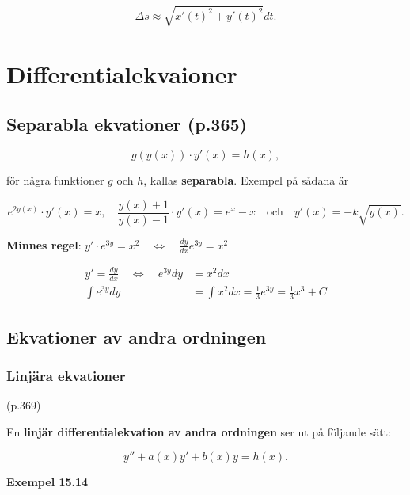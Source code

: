 \documentclass[11pt]{article}
\begin{document}
\begin{equation}
    \Delta s \approx \sqrt{x'(t)^2 + y'(t)^2}dt.
    \label{eq:kurvlangd}
\end{equation}

\newpage
\section{Differentialekvaioner}

\subsection{Separabla ekvationer (p.365)}

\begin{equation}
    g(y(x)) \cdot y'(x) = h(x),
\end{equation}

för några funktioner $g$ och $h$, kallas \textbf{separabla}. Exempel på sådana är

\begin{equation}
    e^{2y(x)} \cdot y'(x) = x, \quad \frac{y(x) + 1}{y(x) - 1} \cdot y'(x) = e^x - x \quad \text{och} \quad y'(x) = -k\sqrt{y(x)}.
\end{equation}

\textbf{Minnes regel}: $y' \cdot e^{3y} = x^2 \quad \Leftrightarrow \quad \frac{dy}{dx}e^{3y} = x^2$

\begin{align}
    y' = \frac{dy}{dx} \quad \Leftrightarrow \quad e^{3y}dy &= x^2 dx\\
    \int e^{3y}dy &= \int x^2 dx = \frac{1}{3} e^{3y} = \frac{1}{3} x^3 + C
\end{align}

\subsection{Ekvationer av andra ordningen}

\subsubsection{Linjära ekvationer} (p.369)

En \textbf{linjär differentialekvation av andra ordningen} ser ut på följande sätt:

\begin{equation}
    y'' + a(x)y' + b(x)y = h(x).
\end{equation}

\textbf{Exempel 15.14}
\end{document}
